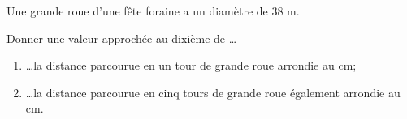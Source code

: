 \documentclass[a4paper]{book}
\begin{document}
    \begin{exercice}
        Une grande roue d’une fête foraine a un diamètre de 38 m. 

        \medskip
        
        Donner une valeur approchée au dixième de …

        \begin{enumerate}
            \item \ldots la distance parcourue en un tour de grande roue arrondie au cm;

            \item \ldots la distance parcourue en cinq tours de grande roue également arrondie au cm.
        \end{enumerate}  
    \end{exercice}
\end{document}
